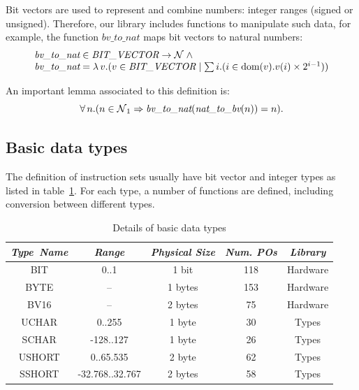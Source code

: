 \documentclass[a4paper]{llncs}
\begin{document}
Bit vectors are used to represent and combine numbers: integer ranges
(signed or unsigned). Therefore, our library includes functions to
manipulate such data, for example, the function $\textit{bv\_to\_nat}$
maps bit vectors to natural numbers:
$$
\begin{array}{l}
\textit{bv\_to\_nat} \in \textit{BIT\_VECTOR} \fun \nat  \land \\
\textit{bv\_to\_nat} = \lambda v .  (v \in \textit{BIT\_VECTOR} \mid  \sum i . (i \in \dom(v) . v(i)
\times 2^{i-1}))
\end{array}
$$

An important lemma associated to this definition is: 
$$\forall n . (n \in \nat_1 \implies \textit{bv\_to\_nat}(\textit{nat\_to\_bv}(n)) = n).$$



\subsection{Basic data types}

The definition of instruction sets usually have bit vector and integer
types as listed in table~\ref{tab:types}. For each type, a number of
functions are defined, including conversion between different types.

\begin{table}
\caption{Details of basic data types}
\label{tab:types}
\begin{center}
\begin{tabular}{|c|c|c|c|c|}
\hline
 \textit{Type\ Name} & \textit{Range} & \textit{Physical Size}  & \textit{Num. POs} & \textit{Library} \\\hline
 BIT & 0..1 & 1 bit &   118 & Hardware \\\hline %
 BYTE & -- & 1 bytes &  153 & Hardware \\\hline%
 BV16 & -- & 2 bytes &  75 & Hardware \\ \hline%
 UCHAR & 0..255 & 1 byte &  30 & Types \\\hline %
 SCHAR & -128..127 & 1 byte & 26 & Types \\\hline %
 USHORT & 0..65.535 & 2 byte & 62 & Types \\\hline %
 SSHORT & -32.768..32.767 & 2 bytes & 58 & Types \\\hline %
\end{tabular}
\end{center}
\end{table}
\end{document}

